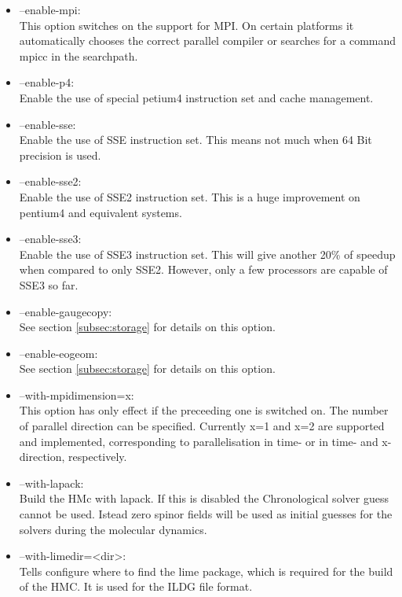 \begin{itemize}
\item {\ttfamily --enable-mpi}:\\
  This option switches on the support for MPI. On certain platforms it
  automatically chooses the correct parallel compiler or searches for
  a command {\ttfamily mpicc} in the searchpath.

\item {\ttfamily --enable-p4}:\\
  Enable the use of special petium4 instruction set and cache
  management.

\item {\ttfamily --enable-sse}:\\
  Enable the use of SSE instruction set. This means not much when 64
  Bit precision is used.

\item {\ttfamily --enable-sse2}:\\
  Enable the use of SSE2 instruction set. This is a huge improvement
  on pentium4 and equivalent systems.

\item {\ttfamily --enable-sse3}:\\
  Enable the use of SSE3 instruction set. This will give another 20\%
  of speedup when compared to only SSE2. However, only a few
  processors are capable of SSE3 so far.

\item {\ttfamily --enable-gaugecopy}:\\
  See section \ref{subsec:storage} for details on this option.

\item {\ttfamily --enable-eogeom}:\\
  See section \ref{subsec:storage} for details on this option.


\item {\ttfamily --with-mpidimension=x}:\\
  This option has only effect if the preceeding one is switched
  on. The number of parallel direction can be specified. Currently
  {\ttfamily x=1} and {\ttfamily x=2} are supported and implemented,
  corresponding to parallelisation in time- or in time- and x-direction,
  respectively.

\item {\ttfamily --with-lapack}:\\
  Build the HMc with lapack. If this is disabled the Chronological
  solver guess cannot be used. Istead zero spinor fields will be used
  as initial guesses for the solvers during the molecular dynamics.

\item {\ttfamily --with-limedir=<dir>}:\\
 Tells configure where to find the lime package, which is required for
 the build of the HMC. It is used for the ILDG file format.

\end{itemize}

